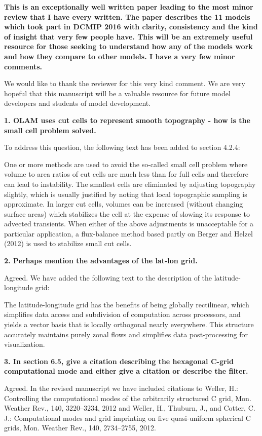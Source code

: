\documentclass{article}
\begin{document}
\textbf{{This is an exceptionally well written paper leading to the most minor review that I have
every written. The paper describes the 11 models which took part in DCMIP 2016 with
clarity, consistency and the kind of insight that very few people have. This will be an
extremely useful resource for those seeking to understand how any of the models work
and how they compare to other models. I have a very few minor comments.}}

We would like to thank the reviewer for this very kind comment.  We are very hopeful that this manuscript will be a valuable resource for future model developers and students of model development.

\textbf{{1. OLAM uses cut cells to represent smooth topography - how is the small cell problem solved.}}

To address this question, the following text has been added to section 4.2.4:

{\color{blue}One or more methods are used to avoid the so-called small cell problem where volume to area ratios of cut cells are much less than for full cells and therefore can lead to instability. The smallest cells are eliminated by adjusting topography slightly, which is usually justified by noting that local topographic sampling is approximate. In larger cut cells, volumes can be increased (without changing surface areas) which stabilizes the cell at the expense of slowing its response to advected transients. When either of the above adjustments is unacceptable for a particular application, a flux-balance method based partly on Berger and Helzel (2012) is used to stabilize small cut cells.}

\textbf{{2. Perhaps mention the advantages of the lat-lon grid.}}

Agreed.  We have added the following text to the description of the latitude-longitude grid:

{\color{blue}The latitude-longitude grid has the benefits of being globally rectilinear, which simplifies data access and subdivision of computation across processors, and yields a vector basis that is locally orthogonal nearly everywhere.  This structure accurately maintains purely zonal flows and simplifies data post-processing for visualization.}

\textbf{{3. In section 6.5, give a citation describing the hexagonal C-grid computational mode
and either give a citation or describe the filter.}}

Agreed.  In the revised manuscript we have included citations to Weller, H.: Controlling the computational modes of the arbitrarily structured C grid, Mon. Weather Rev., 140, 3220--3234, 2012 and Weller, H., Thuburn, J., and Cotter, C. J.: Computational modes and grid imprinting on five quasi-uniform spherical C grids, Mon. Weather Rev., 140, 2734--2755, 2012.
\end{document}
